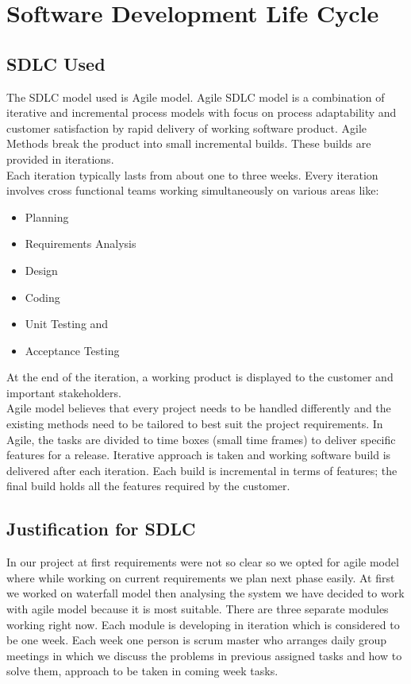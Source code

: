 \documentclass[12pt]{article}
\begin{document}
\section{Software Development Life Cycle}
\subsection{SDLC Used}
The SDLC model used is Agile model.
Agile SDLC model is a combination of iterative and incremental process models with focus on process adaptability and customer satisfaction by rapid delivery of working software product. Agile Methods break the product into small incremental builds. These builds are provided in iterations.\\
Each iteration typically lasts from about one to three weeks. Every iteration involves cross functional teams working simultaneously on various areas like:
\begin{itemize}
\item Planning
\item Requirements Analysis
\item Design
\item Coding
\item Unit Testing and
\item Acceptance Testing
\end{itemize}

At the end of the iteration, a working product is displayed to the customer and important stakeholders.\\
Agile model believes that every project needs to be handled differently and the existing methods need to be tailored to best suit the project requirements. In Agile, the tasks are divided to time boxes (small time frames) to deliver specific features for a release. Iterative approach is taken and working software build is delivered after each iteration. Each build is incremental in terms of features; the final build holds all the features required by the customer.\\

\subsection{Justification for SDLC}
In our project at first requirements were not so clear so we opted for agile model where while working on current requirements we plan next phase easily.
At first we worked on waterfall model then analysing the system we have decided to work with agile model because it is most suitable. There are three separate modules working right now. Each module is developing in iteration which is considered to be one week. Each week one person is scrum master who arranges daily group meetings in which we discuss the problems in previous assigned tasks and how to solve them, approach to be taken in coming week tasks.
\end{document}
